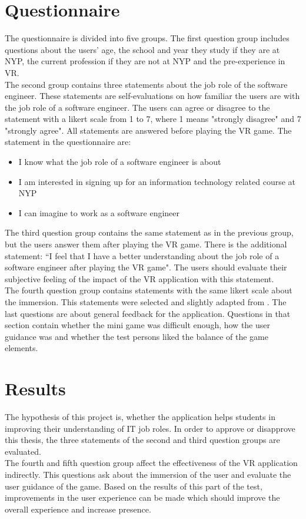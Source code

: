 \section{Questionnaire}
The questionnaire is divided into five groups. The first question group includes questions about the users' age, the school and year they study if they are at NYP, the current profession if they are not at NYP and the pre-experience in VR.\\
The second group contains three statements about the job role of the software engineer. These statements are self-evaluations on how familiar the users are with the job role of a software engineer. The users can agree or disagree to the statement with a likert scale from 1 to 7, where 1 means "strongly disagree" and 7 "strongly agree". All statements are answered before playing the VR game. The statement in the questionnaire are:
\begin{itemize}
\item I know what the job role of a software engineer is about 
\item  I am interested in signing up for an information technology related course at NYP 
\item  I can imagine to work as a software engineer 
\end{itemize}
The third question group contains the same statement as in the previous group, but the users answer them after playing the VR game.  There is the additional statement: ``I feel that I have a better understanding about the job role of a software engineer after playing the VR game". The users should evaluate their subjective feeling of the impact of the VR application with this statement.\\
The fourth question group contains statements with the same likert scale about the immersion. This statements were selected and slightly adapted from \cite{Witmer.1998}.
The last questions are about general feedback for the application. Questions in that section contain whether the mini game was difficult enough, how the user guidance was and whether the test persons liked the balance of the game elements.

\section{Results}
The hypothesis of this project is, whether the application helps students in improving their understanding of IT job roles.
In order to approve or disapprove this thesis, the three statements of the second and third question groups are evaluated.\\
The fourth and fifth question group affect the effectiveness of the VR application indirectly. This questions ask about the immersion of the user and evaluate the user guidance of the game. Based on the results of this part of the test, improvements in the user experience can be made which should improve the overall experience and increase presence.
